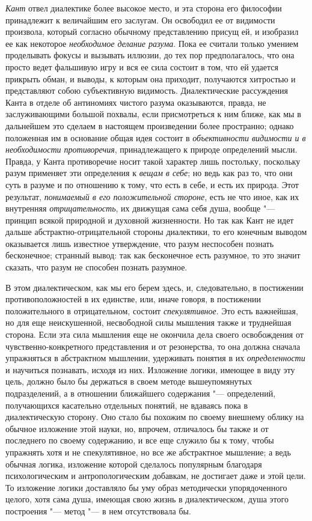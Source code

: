 {\em Кант} отвел диалектике более высокое место, и эта
сторона его философии принадлежит к величайшим его заслугам. Он освободил
ее от видимости произвола, который согласно обычному представлению присущ
ей, и изобразил ее как некоторое {\em необходимое
делание разума}. Пока ее считали только умением проделывать фокусы и
вызывать иллюзии, до тех пор предполагалось, что она просто ведет фальшивую
игру и вся ее сила состоит в том, что ей удается прикрыть обман, и выводы,
к которым она приходит, получаются хитростью и представляют собою
субъективную видимость. Диалектические рассуждения Канта в отделе об
антиномиях чистого разума оказываются, правда, не заслуживающими большой
похвалы, если присмотреться к ним ближе, как мы в дальнейшем это сделаем в
настоящем произведении более пространно; однако положенная им в основание
общая идея состоит в {\em объективности видимости и в
необходимости противоречия}, принадлежащего к природе определений мысли.
Правда, у Канта противоречие носит такой характер лишь постольку, поскольку
разум применяет эти определения к {\em вещам в себе};
но ведь как раз то, что они суть в разуме и по отношению к тому, что есть в
себе, и есть их природа. Этот результат,
{\em понимаемый в его положительной стороне}, есть не
что иное, как их внутренняя {\em отрицательность}, их
движущая сама себя душа, вообще "--- принцип всякой природной и духовной
жизненности. Но так как Кант не идет дальше абстрактно-отрицательной
стороны диалектики, то его конечным выводом оказывается лишь известное
утверждение, что разум неспособен познать бесконечное; странный вывод: так
как бесконечное есть разумное, то это значит сказать, что разум не способен
познать разумное.

В этом диалектическом, как мы его берем здесь, и, следовательно, в
постижении противоположностей в их единстве, или, иначе говоря, в
постижении положительного в отрицательном, состоит
{\em спекулятивное}. Это есть важнейшая, но для еще
неискушенной, несвободной силы мышления также и труднейшая сторона. Если
эта сила мышления еще не окончила дела своего освобождения от
чувственно-конкретного представления и от резонерства, то она должна
сначала упражняться в абстрактном мышлении, удерживать понятия в их
{\em определенности} и научиться познавать, исходя из
них. Изложение логики, имеющее в виду эту цель, должно было бы держаться в
своем методе вышеупомянутых подразделений, а в отношении ближайшего
содержания "--- определений, получающихся касательно отдельных понятий, не
вдаваясь пока в диалектическую сторону. Оно стало бы похожим по своему
внешнему облику на обычное изложение этой науки, но, впрочем, отличалось бы
также и от последнего по своему содержанию, и все еще служило бы к тому,
чтобы упражнять хотя и не спекулятивное, но все же абстрактное мышление; а
ведь обычная логика, изложение которой сделалось популярным благодаря
психологическим и антропологическим добавкам, не достигает даже и этой
цели. То изложение логики доставляло бы уму образ методически
упорядоченного целого, хотя сама душа, имеющая свою жизнь в диалектическом,
душа этого построения "--- метод "--- в нем отсутствовала бы.

